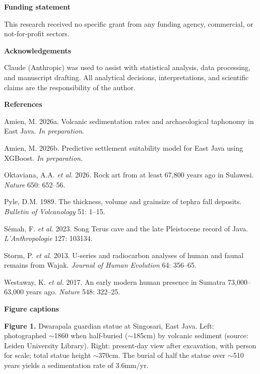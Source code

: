 \documentclass[12pt]{article}
\begin{document}
\textbf{Funding statement}

This research received no specific grant from any funding agency, commercial, or not-for-profit sectors.

\vspace{6pt}

\textbf{Acknowledgements}

Claude (Anthropic) was used to assist with statistical analysis, data processing, and manuscript drafting. All analytical decisions, interpretations, and scientific claims are the responsibility of the author.

\vspace{12pt}

\textbf{References}

\hangindent=1.27cm Amien, M. 2026a. Volcanic sedimentation rates and archaeological taphonomy in East Java. \textit{In preparation}.

\hangindent=1.27cm Amien, M. 2026b. Predictive settlement suitability model for East Java using XGBoost. \textit{In preparation}.

\hangindent=1.27cm Oktaviana, A.A. \textit{et al.} 2026. Rock art from at least 67,800 years ago in Sulawesi. \textit{Nature} 650: 652--56.

\hangindent=1.27cm Pyle, D.M. 1989. The thickness, volume and grainsize of tephra fall deposits. \textit{Bulletin of Volcanology} 51: 1--15.

\hangindent=1.27cm S\'{e}mah, F. \textit{et al.} 2023. Song Terus cave and the late Pleistocene record of Java. \textit{L'Anthropologie} 127: 103134.

\hangindent=1.27cm Storm, P. \textit{et al.} 2013. U-series and radiocarbon analyses of human and faunal remains from Wajak. \textit{Journal of Human Evolution} 64: 356--65.

\hangindent=1.27cm Westaway, K. \textit{et al.} 2017. An early modern human presence in Sumatra 73,000--63,000 years ago. \textit{Nature} 548: 322--25.

\vspace{12pt}

\textbf{Figure captions}

\textbf{Figure 1.} Dwarapala guardian statue at Singosari, East Java. Left: photographed $\sim$1860 when half-buried ($\sim$185cm) by volcanic sediment (source: Leiden University Library). Right: present-day view after excavation, with person for scale; total statue height $\sim$370cm. The burial of half the statue over $\sim$510 years yields a sedimentation rate of 3.6mm/yr.
\end{document}
